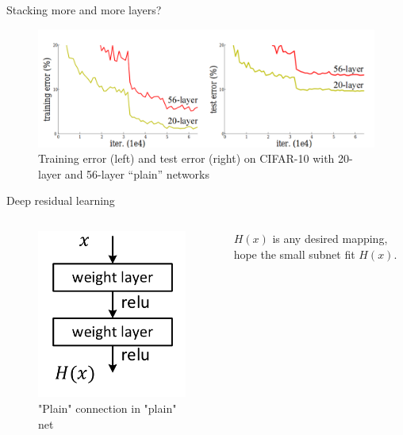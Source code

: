 \documentclass[aspectratio=169]{beamer}
\begin{document}
\begin{frame}{Stacking more and more layers?}
\begin{figure}
    \centering
    \includegraphics[scale = 0.2]{demo/figs/stacking.png}
    \caption{Training error (left) and test error (right) on CIFAR-10
with 20-layer and 56-layer “plain” networks}
    \label{fig:stacking}
\end{figure}    
\end{frame}

\begin{frame}{Deep residual learning}
\begin{columns}[T,c,onlytextwidth]
\begin{figure}
    \includegraphics[scale=0.25]{demo/figs/plain.png}
    \caption{"Plain" connection in "plain" net}
    \label{fig:1x1}
\end{figure}

\begin{alertblock}{}
$H(x)$ is any desired mapping, hope the small subnet fit $H(x)$.
\end{alertblock}
\end{columns}
\end{frame}
\end{document}

